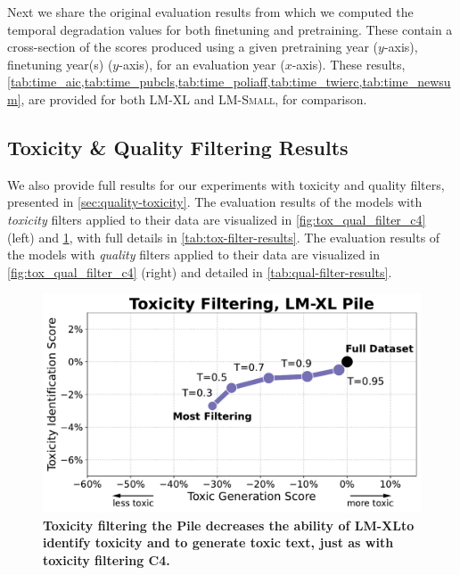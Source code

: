 \documentclass{article}
\newcommand{\smalLM}[0]{\textsc{LM-Small}}
\newcommand{\bigLM}[0]{\textsc{LM-XL}}
\begin{document}
Next we share the original evaluation results from which we computed the temporal degradation values for both finetuning and pretraining.
These contain a cross-section of the scores produced using a given pretraining year ($y$-axis), finetuning year(s) ($y$-axis), for an evaluation year ($x$-axis).
These results, \cref{tab:time_aic,tab:time_pubcls,tab:time_poliaff,tab:time_twierc,tab:time_newsum}, are provided for both \bigLM{} and \smalLM, for comparison.




% 
% 
% 
% 

\clearpage
\vspace{-3mm}
\subsection{Toxicity \& Quality Filtering Results}

We also provide full results for our experiments with toxicity and quality filters, presented in \cref{sec:quality-toxicity}.
The evaluation results of the models with \emph{toxicity} filters applied to their data are visualized in \cref{fig:tox_qual_filter_c4} (left) and \cref{fig:tox_filter_pile}, with full details in \cref{tab:tox-filter-results}.
The evaluation results of the models with \emph{quality} filters applied to their data are visualized in \cref{fig:tox_qual_filter_c4} (right) and detailed in \cref{tab:qual-filter-results}.

\begin{figure}[ht]
    \centering
    \includegraphics[width=.4\textwidth]{fables/toxicity/tox-filter_lm-xl-pile.pdf}
    \caption{
    \textbf{Toxicity filtering the Pile decreases the ability of \bigLM to identify toxicity and to generate toxic text, just as with toxicity filtering C4.}
    }
    \label{fig:tox_filter_pile}
\end{figure}



\end{document}
